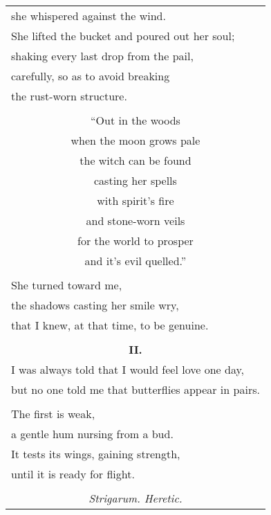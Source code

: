 \documentclass{article}
\begin{document}
\begin{center}
\begin{longtable}{l}
she whispered against the wind. \\
She lifted the bucket and poured out her soul; \\
shaking every last drop from the pail, \\
carefully, so as to avoid breaking \\
the rust-worn structure. \\
\\
\multicolumn{1}{c}{``Out in the woods} \\
\multicolumn{1}{c}{when the moon grows pale} \\
\multicolumn{1}{c}{the witch can be found} \\
\multicolumn{1}{c}{casting her spells} \\
\multicolumn{1}{c}{with spirit's fire} \\
\multicolumn{1}{c}{and stone-worn veils} \\
\multicolumn{1}{c}{for the world to prosper} \\
\multicolumn{1}{c}{and it's evil quelled.''} \\
\\
She turned toward me, \\
the shadows casting her smile wry, \\
that I knew, at that time, to be genuine. \\
\\
\multicolumn{1}{c}{\textbf{II.}} \\ %
I was always told that I would feel love one day, \\
but no one told me that butterflies appear in pairs. \\
\\
The first is weak, \\
a gentle hum nursing from a bud. \\
It tests its wings, gaining strength, \\
until it is ready for flight. \\
\\
\multicolumn{1}{c}{\textit{Strigarum. Heretic.}} \\ %

\end{longtable}
\end{center}
\end{document}
